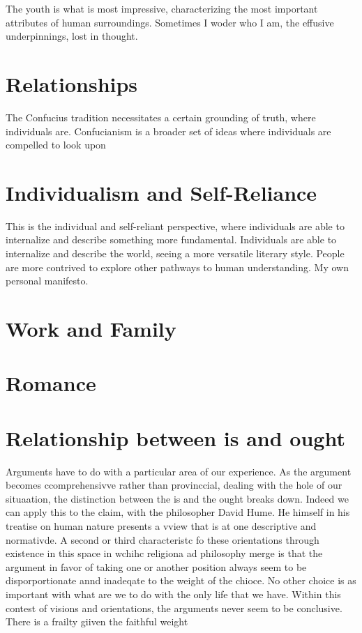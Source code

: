 \documentclass[12pt,letterpaper]{article}
\begin{document}
The youth is what is most impressive, characterizing the most important attributes of human surroundings.  Sometimes I woder who I am, the effusive underpinnings, lost in thought.

\section{Relationships}
The Confucius tradition necessitates a certain grounding of truth, where individuals are.  Confucianism is a broader set of ideas where individuals are compelled to look upon

\section{Individualism and Self-Reliance}
This is the individual and self-reliant perspective, where individuals are able to internalize and describe something more fundamental.  Individuals are able to internalize and describe the world, seeing a more versatile literary style.  People are more contrived to explore other pathways to human understanding.  My own personal manifesto.

\section{Work and Family}

\section{Romance}

\section{Relationship between is and ought}
Arguments have to do with a particular area of our experience.  As the argument becomes ccomprehensivve rather than provinccial, dealing with the hole of our situaation, the distinction between the is and the ought breaks down.  Indeed we can apply this to the claim, with the philosopher David Hume.  He himself in his treatise on human nature presents a vview that is at one descriptive and normativde.  A second or third characteristc fo these orientations through existence in this space in wchihc religiona ad philosophy merge is that the argument in favor of taking one or another position always seem to be disporportionate annd inadeqate to the weight  of the chioce.  No other choice is as important with what are we to do with the only life that we have.  Within this contest of visions and orientations, the arguments never seem to be conclusive.  There is a frailty giiven the faithful weight 
\end{document}
